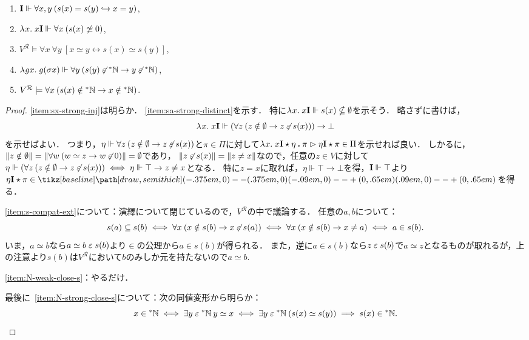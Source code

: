 \documentclass[realisability.tex]{subfiles}
\begin{document}
\begin{lemma}\label{lem:s-0-compat}
 \begin{enumerate}
  \item \label{item:sx-strong-inj}$\mathsf{\mathbf{I}} \Vdash \forall x, y \: (s(x) = s(y) \hookrightarrow x = y)$,
  \item \label{item:sa-strong-distinct}$\lambda^{\mathsf{}}x.\;x\mathsf{\mathbf{I}} \Vdash \forall x \: (s(x) \not\simeq 0)$,
  \item \label{item:s-compat-ext}$V^{\mathcal{R}} \models \forall x\: \forall y \: [x \simeq y \leftrightarrow s(x) \simeq s(y)]$,
  \item \label{item:N-weak-close-s} $\lambda^{\mathsf{}}g x.\;g(\sigma x) \Vdash \forall y \: (s(y) \not\mathrel{\varepsilon} \mathord{{}^{*}\mathbb{N}} \to y \not\mathrel{\varepsilon} \mathord{{}^{*}\mathbb{N}}) $,
  \item \label{item:N-strong-close-s}$V^{\mathcal{R}} \models \forall x \: (s(x) \notin \mathord{{}^{*}\mathbb{N}} \to x \notin \mathord{{}^{*}\mathbb{N}})$.
 \end{enumerate}
\end{lemma}
\begin{proof}
 \ref{item:sx-strong-inj}は明らか．
 \ref{item:sa-strong-distinct}を示す．
 特に$\lambda^{\mathsf{}}x.\;x \mathsf{\mathbf{I}} \Vdash s(x) \nsubseteq \emptyset$を示そう．
 略さずに書けば，
 \[
  \lambda^{\mathsf{}}x.\;x \mathsf{\mathbf{I}} \Vdash (\forall z \: (z \notin \emptyset \to z \not\mathrel{\varepsilon} s(x))) \to \bot
 \]
 を示せばよい．
 つまり，$\eta \Vdash \forall z \: (z \notin \emptyset \to z \not\mathrel{\varepsilon} s(x))$と$\pi \in \Pi$に対して$\lambda^{\mathsf{}}x.\;x \mathsf{\mathbf{I}} \mathbin{\star} \eta \mathbin{\boldsymbol{.}} \pi \mathrel{\rhd} \eta \mathsf{\mathbf{I}} \mathbin{\star} \pi \in \Pi$を示せれば良い．
 しかるに，$\|z \notin \emptyset\| = \|\forall w\: (w \simeq z \to w \not\mathrel{\varepsilon} 0)\| = \emptyset$であり，
 $\|z \not\mathrel{\varepsilon} s(x)\| = \| z \neq x \|$なので，任意の$z \in V$に対して$\eta \Vdash (\forall z \: (z \notin \emptyset \to z \not\mathrel{\varepsilon} s(x))) \iff \eta \Vdash \top \to z \neq x$となる．
 特に$z = x$に取れば，$\eta \Vdash \top \to \bot$を得，$\mathsf{\mathbf{I}} \Vdash \top$より$\eta \I \cons \pi \in \pole$を得る．

 \ref{item:s-compat-ext}について：演繹について閉じているので，$V^{\mathcal{R}}$の中で議論する．
 任意の$a, b$について：
 \[ s(a) \subseteq s(b)
 \iff \forall x\: (x \notin s(b) \to x \not\mathrel{\varepsilon} s(a))
 \iff \forall x\: (x \notin s(b) \to x \neq a)
 \iff a \in s(b).
 \]
 いま，$a \simeq b$なら$a \simeq b \mathrel{\varepsilon} s(b)$より${\in}$の公理から$a \in s(b)$が得られる．
 また，逆に$a \in s(b)$なら$z \mathrel{\varepsilon} s(b)$で$a \simeq z$となるものが取れるが，上の注意より$s(b)$は$V^{\mathcal{R}}$において$b$のみしか元を持たないので$a \simeq b$.

 \ref{item:N-weak-close-s}：やるだけ．

 最後に~\ref{item:N-strong-close-s}について：次の同値変形から明らか：
 \[
       x \in \mathord{{}^{*}\mathbb{N}}
 \iff \exists y \mathrel{\varepsilon} \mathord{{}^{*}\mathbb{N}} \: y \simeq x
 \iff \exists y \mathrel{\varepsilon} \mathord{{}^{*}\mathbb{N}} \: (s(x) \simeq s(y))
 \implies s(x) \in \mathord{{}^{*}\mathbb{N}}.
 \]
\end{proof}
\end{document}
